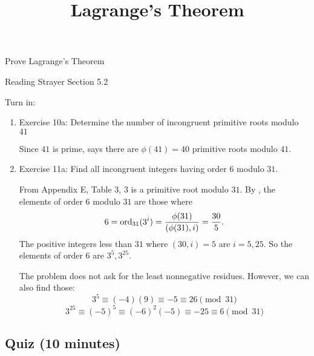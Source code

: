 \documentclass{../ximera}
\title{Lagrange's Theorem}
\begin{document}
\begin{abstract}
\end{abstract}
\maketitle

\begin{obj}
    \item Prove Lagrange's Theorem
\end{obj}


\begin{pre}
    \item[Reading] Strayer Section 5.2
    \item[Turn in:] 
    
    \begin{enumerate}
        \item Exercise 10a: Determine the number of incongruent primitive roots modulo $41$
        \begin{solution}
            Since $41$ is prime,  says there are $\phi(41)=40$ primitive roots modulo $41.$
        \end{solution}
        \item Exercise 11a: Find all incongruent integers having order $6$ modulo $31.$
        \begin{solution}
                From Appendix E, Table 3, $3$ is a primitive root modulo $31.$ By , the elements of order $6$ modulo $31$ are those where \[6=\operatorname{ord}_{31}(3^i)=\frac{\phi(31)}{(\phi(31),i)}=\frac{30}{5}.\] The positive integers less than $31$ where $(30,i)=5$ are $i=5,25.$ So the elements of order $6$ are $3^5, 3^{25}.$
                

                The problem does not ask for the least nonnegative residues. However, we can also find those:
                    \[
                        3^5\equiv (-4)(9)\equiv -5\equiv 26\pmod{31}
                    \]
                    \[
                        3^{25}\equiv (-5)^{5}\equiv (-6)^2(-5)\equiv -25\equiv 6\pmod{31}
                    \]
            \end{solution}
    \end{enumerate}
\end{pre}

\subsection{Quiz (10 minutes)}
\end{document}
